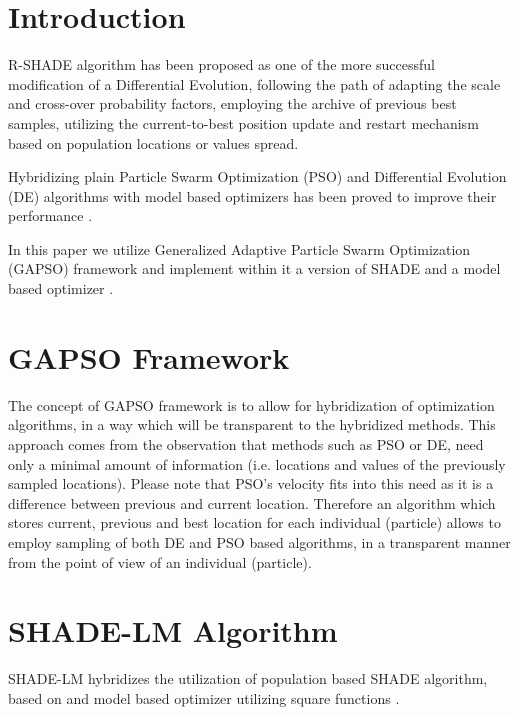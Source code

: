 \documentclass[sigconf]{acmart}
\begin{document}
\maketitle

\section{Introduction}

R-SHADE \cite{Tanabe2014} algorithm has been proposed as one of the more successful
modification of a Differential Evolution, following the path of adapting the scale
and cross-over probability factors, employing the archive of previous best samples,
utilizing the current-to-best position update and restart mechanism based on population
locations or values spread.

Hybridizing plain Particle Swarm Optimization (PSO) and Differential Evolution (DE)
algorithms with model based optimizers has been proved
to improve their performance \cite{zaborski2019generalized,zaborski2020analysis,Okulewicz2020}.

In this paper we utilize Generalized Adaptive Particle Swarm Optimization (GAPSO) framework \cite{ulinski2018generalized,Okulewicz2020}
and implement within it a version of SHADE \cite{Tanabe2014} and a model based optimizer \cite{zaborski2020analysis}.
%
\section{GAPSO Framework}
The concept of GAPSO framework is to allow for hybridization of optimization algorithms,
in a way which will be transparent to the hybridized methods.
This approach comes from the observation that methods such as PSO or DE,
need only a minimal amount of information (i.e. locations and values
of the previously sampled locations). Please note that PSO's velocity
fits into this need as it is a difference between previous and current location.
Therefore an algorithm which stores current, previous and best location
for each individual (particle) allows to employ sampling of both DE and PSO
based algorithms, in a transparent manner from the point of view of an individual (particle).

\section{SHADE-LM Algorithm}

SHADE-LM hybridizes the utilization of population based SHADE
algorithm, based on \cite{Tanabe2014} and model based optimizer
utilizing square functions \cite{zaborski2020analysis}.
\end{document}
